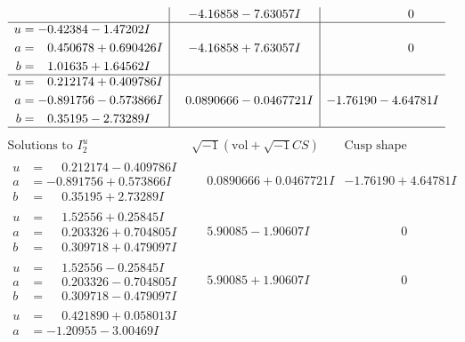 \documentclass[1p]{elsarticle_modified}
\theoremstyle{definition}
\newcommand{\I}{\sqrt{-1}}
\begin{document}
$$\begin{array}{c|c|c}
 & -4.16858 - 7.63057 I & \phantom{-0.000000 } 0 \\ \hline\begin{aligned}
u &= -0.42384 - 1.47202 I \\
a &= \phantom{-}0.450678 + 0.690426 I \\
b &= \phantom{-}1.01635 + 1.64562 I\end{aligned}
 & -4.16858 + 7.63057 I & \phantom{-0.000000 } 0 \\ \hline\begin{aligned}
u &= \phantom{-}0.212174 + 0.409786 I \\
a &= -0.891756 - 0.573866 I \\
b &= \phantom{-}0.35195 - 2.73289 I\end{aligned}
 & \phantom{-}0.0890666 - 0.0467721 I & -1.76190 - 4.64781 I\\
 \hline 
 \end{array}$$\newpage$$\begin{array}{c|c|c}  
\text{Solutions to }I^u_{2}& \I (\text{vol} + \sqrt{-1}CS) & \text{Cusp shape}\\
 \hline 
\begin{aligned}
u &= \phantom{-}0.212174 - 0.409786 I \\
a &= -0.891756 + 0.573866 I \\
b &= \phantom{-}0.35195 + 2.73289 I\end{aligned}
 & \phantom{-}0.0890666 + 0.0467721 I & -1.76190 + 4.64781 I \\ \hline\begin{aligned}
u &= \phantom{-}1.52556 + 0.25845 I \\
a &= \phantom{-}0.203326 + 0.704805 I \\
b &= \phantom{-}0.309718 + 0.479097 I\end{aligned}
 & \phantom{-}5.90085 - 1.90607 I & \phantom{-0.000000 } 0 \\ \hline\begin{aligned}
u &= \phantom{-}1.52556 - 0.25845 I \\
a &= \phantom{-}0.203326 - 0.704805 I \\
b &= \phantom{-}0.309718 - 0.479097 I\end{aligned}
 & \phantom{-}5.90085 + 1.90607 I & \phantom{-0.000000 } 0 \\ \hline\begin{aligned}
u &= \phantom{-}0.421890 + 0.058013 I \\
a &= -1.20955 - 3.00469 I \\

\end{aligned}
\end{array}$$
\end{document}

